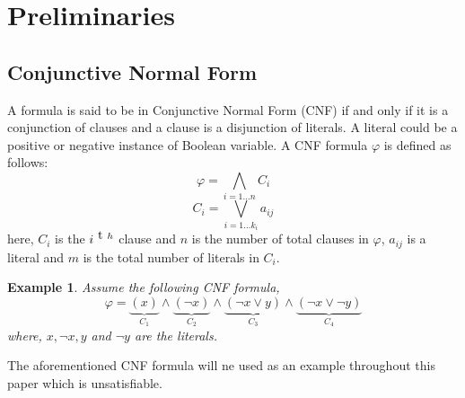 \newtheorem{example}{Example}
\section{Preliminaries}
\label{sec:preliminaries}
\subsection{Conjunctive Normal Form}
A formula is said to be in Conjunctive Normal Form (CNF) if and only if it is a conjunction of clauses and a clause is a disjunction of literals. A literal could be a positive or negative instance of Boolean variable. A CNF formula $\varphi$ is defined as follows:
$$\varphi = \bigwedge\limits_{i=1\ldots n} C_{i}$$
$$ C_{i} = \bigvee\limits_{i=1\ldots k_{i}} a_{ij}$$
here, $C_{i}$ is the $i^{\text th}$ clause and $n$ is the number of total clauses in $\varphi$, $a_{ij}$ is a literal and $m$ is the total number of literals in $C_{i}$.\newline
\begin{example}
	Assume the following CNF formula,
	$$\varphi=\underbrace{(x)}\limits_{C_{1}}\wedge\underbrace{(\neg x)}\limits_{C_2}\wedge\underbrace{(\neg x\vee y)}\limits_{C_{3}}\wedge\underbrace{(\neg x \vee \neg y)}\limits_{C_{4}}$$
	where, $x, \neg x, y$ and $\neg y$ are the literals.
\end{example}
The aforementioned CNF formula will ne used as an example throughout this paper which is unsatisfiable.
